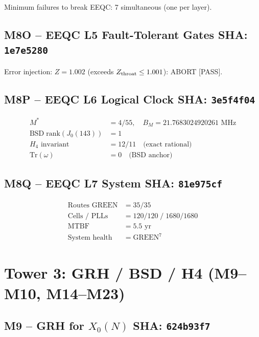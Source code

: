 \documentclass[12pt,letterpaper]{article}
\begin{document}
Minimum failures to break EEQC: 7 simultaneous (one per layer).

\subsection{M8O -- EEQC L5 Fault-Tolerant Gates \hfill SHA: \texttt{1e7e5280}}

Error injection: $Z = 1.002$ (exceeds $Z_{\rm throat} \leq 1.001$): ABORT [PASS].

\subsection{M8P -- EEQC L6 Logical Clock \hfill SHA: \texttt{3e5f4f04}}

\begin{align}
  M^* &= 4/55,\quad B_M = 21.7683024920261\text{ MHz} \\
  \mathrm{BSD\; rank}(J_0(143)) &= 1 \\
  H_4\text{ invariant} &= 12/11 \quad\text{(exact rational)} \\
  \mathrm{Tr}(\omega) &= 0 \quad\text{(BSD anchor)}
\end{align}

\subsection{M8Q -- EEQC L7 System \hfill SHA: \texttt{81e975cf}}

\begin{align}
  \text{Routes GREEN} &= 35/35 \\
  \text{Cells / PLLs} &= 120/120 \;/\; 1680/1680 \\
  \mathrm{MTBF} &= 5.5\text{ yr} \\
  \text{System health} &= \mathrm{GREEN}^7
\end{align}

\newpage
\section{Tower 3: GRH / BSD / H4 (M9--M10, M14--M23)}

\subsection{M9 -- GRH for $X_0(N)$ \hfill SHA: \texttt{624b93f7}}
\end{document}
